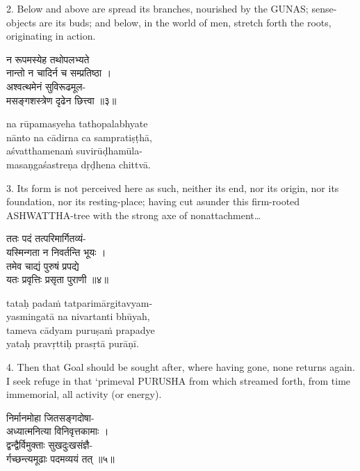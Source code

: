 2. Below and above are spread its branches, nourished by the GUNAS;\@
sense-objects are its buds; and below, in the world of men, stretch forth the
roots, originating in action.

\begin{gitaverse}
न रूपमस्येह तथोपलभ्यते \\
\tab नान्तो न चादिर्न च सम्प्रतिष्ठा । \\
अश्वत्थमेनं सुविरूढमूल- \\
\tab मसङ्गशस्त्रेण दृढेन छित्त्वा ॥३॥
\end{gitaverse}

\begin{transliteration}
na rūpamasyeha tathopalabhyate \\
\tab nānto na cādirna ca sampratiṣṭhā, \\
aśvatthamenaṁ suvirūḍhamūla- \\
\tab masaṇgaśastreṇa dṛḍhena chittvā.
\end{transliteration}

3. Its form is not perceived here as such, neither its end, nor its origin, nor
its foundation, nor its resting-place; having cut asunder this firm-rooted
ASHWATTHA-tree with the strong axe of nonattachment\ldots

\begin{gitaverse}
ततः पदं तत्परिमार्गितव्यं- \\
\tab यस्मिन्गता न निवर्तन्ति भूयः । \\
तमेव चाद्यं पुरुषं प्रपद्ये \\
\tab यतः प्रवृत्तिः प्रसृता पुराणी ॥४॥
\end{gitaverse}

\begin{transliteration}
tataḥ padaṁ tatparimārgitavyam- \\
\tab yasmingatā na nivartanti bhūyah, \\
tameva cādyam puruṣaṁ prapadye \\
\tab yataḥ pravṛttiḥ prasṛtā purāṇī.
\end{transliteration}

4. Then that Goal should be sought after, where having gone, none returns
again. I seek refuge in that `primeval PURUSHA from which streamed forth, from
time immemorial, all activity (or energy).

\begin{gitaverse}
निर्मानमोहा जितसङ्गदोषा- \\
\tab अध्यात्मनित्या विनिवृत्तकामाः । \\
द्वन्द्वैर्विमुक्ताः सुखदुःखसंज्ञै- \\
\tab र्गच्छन्त्यमूढाः पदमव्ययं तत् ॥५॥
\end{gitaverse}

